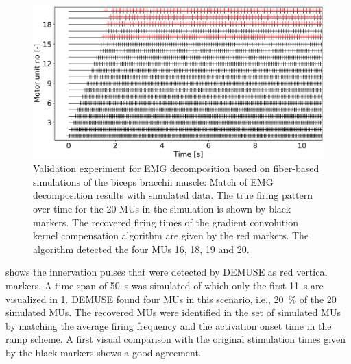\begin{figure}
  \centering%
  \includegraphics[width=\textwidth]{images/results/application/emg_20mus-50s-old2.pdf}%
  \caption{Validation experiment for EMG decomposition based on fiber-based simulations of the biceps bracchii muscle: Match of EMG decomposition results with simulated data. The true firing pattern over time for the 20 MUs in the simulation is shown by black markers. The recovered firing times of the gradient convolution kernel compensation algorithm are given by the red markers. The algorithm detected the four MUs 16, 18, 19 and 20.}%
  \label{fig:emg_20mus-50s-old2}%
\end{figure}

 shows the innervation pulses that were detected by DEMUSE as red vertical markers. A time span of \SI{50}{\s} was simulated of which only the first \SI{11}{\s} are visualized in \cref{fig:emg_20mus-50s-old2}. DEMUSE found four MUs in this scenario, i.e., \SI{20}{\percent} of the 20 simulated MUs. 
The recovered MUs were identified in the set of simulated MUs by matching the  average firing frequency and the activation onset time in the ramp scheme. A first visual comparison with the original stimulation times given by the black markers shows a good agreement.

